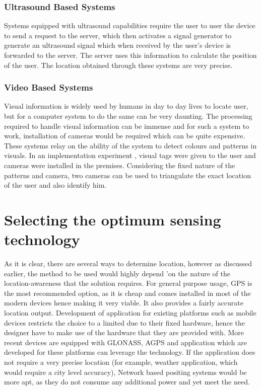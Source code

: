 \documentclass[12pt]{report}
\begin{document}
\subsubsection{Ultrasound Based Systems}
Systems equipped with ultrasound capabilities require the user to user the device to send a request to the server, which then activates a signal generator to generate an ultrasound signal which when received by the user's device is forwarded to the server. The server uses this information to calculate the position of the user. The location obtained through these systems are very precise.


\subsubsection{Video Based Systems}
Visual information is widely used by humans in day to day lives to locate user, but for a computer system to do the same can be very daunting. The processing required to handle visual information can be immense and for such a system to work, installation of cameras would be required which can be quite expensive. These systems relay on the ability of the system to detect colours and patterns in visuals. In an implementation experiment \cite{starner1997augmented}, visual tags were given to the user and cameras were installed in the premises. Considering the fixed nature of the patterns and camera, two cameras can be used to triangulate the exact location of the user and also identify him.

\section{Selecting the optimum sensing technology}

As it is clear, there are several ways to determine location, however as discussed earlier, the method to be used would highly depend 'on the nature of the location-awareness that the solution requires. For general purpose usage, GPS is the most recommended option, as it is cheap and comes installed in most of the modern devices hence making it very viable. It also provides a fairly accurate location output. Development of application for existing platforms such as mobile devices restricts the choice to a limited due to their fixed hardware, hence the designer have to make use of the hardware that they are provided with. More recent devices are equipped with GLONASS, AGPS and application which are developed for these platforms can leverage the technology. If the application does not require a very precise location (for example, weather application, which would require a city level accuracy), Network based positing systems would be more apt, as they do not consume any additional power and yet meet the need.
\end{document}
